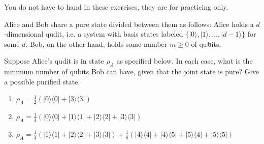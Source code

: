 \documentclass[a4paper,10pt,landscape,twocolumn]{scrartcl}
\newcommand{\ket}[1]{| #1 \rangle}
\newcommand{\bra}[1]{\langle #1 |}
\begin{document}
\practiceproblems

{\sffamily\noindent
You do not have to hand in these exercises, they are for practicing only. %
}

\begin{exercise}
Alice and Bob share a pure state divided between them as follows: Alice holds a $d$-dimensional qudit, i.e. a system with basis states labeled $\{ \ket{0}, \ket{1}, \ldots, \ket{d-1} \}$ for some $d$. Bob, on the other hand, holds some number $m \geq 0$ of qu\textbf{b}its.

Suppose Alice's qudit is in state $\rho_A$ as specified below. In each case, what is the minimum number of qubits Bob can have, given that the joint state is pure? Give a possible purified state.
\begin{enumerate}
\item $\rho_A = \frac12( \ket{0}\bra{0}+\ket{3}\bra{3})$
\item $\rho_A = \frac{1}{4}( \ket{0}\bra{0} +\ket{1}\bra{1}+\ket{2}\bra{2}+\ket{3}\bra{3})$
\item $\rho_A = \frac{1}{4}(\ket{1}\bra{1}+\ket{2}\bra{2}+\ket{3}\bra{3}) + \frac{1}{8} ( \ket{4}\bra{4} + \ket{4}\bra{5} + \ket{5} \bra{4} + \ket{5} \bra{5} )$
\end{enumerate}
\end{exercise}
\end{document}
